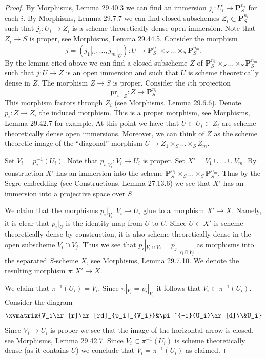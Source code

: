 \begin{proof}
By Morphisms, Lemma 29.40.3 we can find an immersion $j_i:U_i\to\mathbf P_S^{n_i}$ for each $i$. By Morphisms, Lemma 29.7.7 we can find closed subschemes $Z_i\subset\mathbf P_S^{n_i}$ such that $j_i:U_i\to Z_i$ is a scheme theoretically dense open immersion. Note that $Z_i\to S$ is proper, see Morphisms, Lemma 29.44.5. Consider the morphism
\[
j=(j_1|_U,\ldots,j_m|_U):U\longrightarrow
\mathbf P_S^{n_1}\times_S\ldots\times_S\mathbf P_S^{n_m}.
\]
By the lemma cited above we can find a closed subscheme $Z$ of $\mathbf P_S^{n_1}\times_S\ldots\times_S\mathbf P_S^{n_m}$ such that $j:U\to Z$ is an open immersion and such that $U$ is scheme theoretically dense in $Z$. The morphism $Z\to S$ is proper. Consider the $i$th projection
\[\operatorname{pr}_i|_Z:Z\longrightarrow\mathbf P_S^{n_i}.\]
This morphism factors through $Z_i$ (see Morphisms, Lemma 29.6.6). Denote $p_i:Z\to Z_i$ the induced morphism. This is a proper morphism, see Morphisms, Lemma 29.42.7 for example. At this point we have that $U\subset U_i\subset Z_i$ are scheme theoretically dense open immersions. Moreover, we can think of $Z$ as the scheme theoretic image of the ``diagonal'' morphism $U\to Z_1\times_S\ldots\times_S Z_m$.

Set $V_i=p_i^{-1}(U_i)$. Note that $p_i|_{V_i}:V_i\to U_i$ is proper. Set $X'=V_1\cup\ldots\cup V_m$. By construction $X'$ has an immersion into the scheme $\mathbf P_S^{n_1}\times_S\ldots\times_S\mathbf P_S^{n_m}$. Thus by the Segre embedding (see Constructions, Lemma 27.13.6) we see that $X'$ has an immersion into a projective space over $S$.

We claim that the morphisms $p_i|_{V_i}:V_i\to U_i$ glue to a morphism $X'\to X$. Namely, it is clear that $p_i|_U$ is the identity map from $U$ to $U$. Since $U\subset X'$ is scheme theoretically dense by construction, it is also scheme theoretically dense in the open subscheme $V_i\cap V_j$. Thus we see that $p_i|_{V_i\cap V_j}=p_j|_{V_i\cap V_j}$ as morphisms into the separated $S$-scheme $X$, see Morphisms, Lemma 29.7.10. We denote the resulting morphism $\pi:X'\to X$.

We claim that $\pi^{-1}(U_i)=V_i$. Since $\pi|_{V_i}=p_i|_{V_i}$ it follows that $V_i\subset\pi^{-1}(U_i)$. Consider the diagram
\[
\xymatrix{V_i\ar[r]\ar[rd]_{p_i|_{V_i}}&\pi^{-1}(U_i)\ar[d]\\&U_i}
\]
Since $V_i\to U_i$ is proper we see that the image of the horizontal arrow is closed, see Morphisms, Lemma 29.42.7. Since $V_i\subset\pi^{-1}(U_i)$ is scheme theoretically dense (as it contains $U$) we conclude that $V_i=\pi^{-1}(U_i)$ as claimed.


\end{proof}
